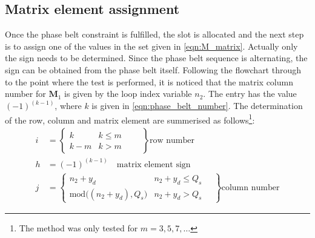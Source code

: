 \subsection{Matrix element assignment}\label{sec:m_assignment}
Once the phase belt constraint is fulfilled, the slot is allocated and the next step is to assign one of the values in the set given in \eqref{eqn:M_matrix}. Actually only the sign needs to be determined. Since the phase belt sequence is alternating, the sign can be obtained from the phase belt itself. Following the flowchart through to the point where the test is performed, it is noticed that the matrix column number for $\mathbf{M}_1$ is given by the loop index variable $n_2$. The entry has the value  $(-1)^{(k-1)}$, where $k$ is given in \eqref{eqn:phase_belt_number}. The determination of the row, column and matrix element are summerised as follows\footnote{The method was only tested for $m=3,5,7,\ldots$}: 
\begin{equation}
  \label{eqn:matrix_element}
  \begin{aligned}
  i &= 
  \left\{ 
    \begin{array}{ll}
      k   & k \leq m\\
      k-m & k > m
    \end{array}
    \qquad 
  \right\}
  \mbox{row number}
  \\
  h &= (-1)^{(k-1)} 
  \quad 
  \mbox{matrix element sign} 
  \\
  j &= 
  \left\{ 
    \begin{array}{ll}
      n_2+y_d   & n_2+y_d \leq Q_s \\
      \mbox{mod}\bigl((n_2+y_d),Q_s\bigr) & n_2+y_d > Q_s
    \end{array} 
    \quad
  \right\}
  \mbox{column number}
  \end{aligned}
\end{equation}

